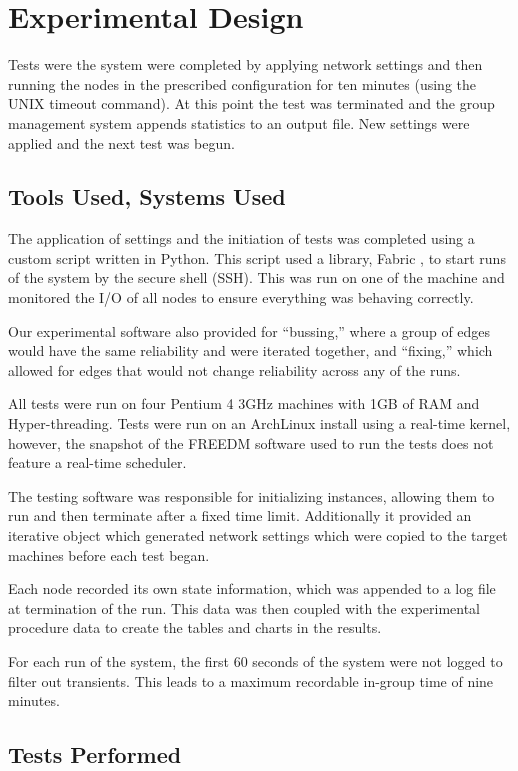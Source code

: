 \section{Experimental Design}

Tests were the system were completed by applying network settings and then running the nodes in the prescribed configuration for ten minutes (using the UNIX timeout command). At this point the test was terminated and the group management system appends statistics to an output file. New settings were applied and the next test was begun.

\subsection{Tools Used, Systems Used}

The application of settings and the initiation of tests was completed using a custom script written in Python. This script used a library, Fabric \cite{FABRIC}, to start runs of the system by the secure shell (SSH). This was run on one of the machine and monitored the I/O of all nodes to ensure everything was behaving correctly.

Our experimental software also provided for ``bussing,'' where a group of edges would
have the same reliability and were iterated together, and ``fixing,'' which allowed for edges that would not change reliability across any of the runs.

All tests were run on four Pentium 4 3GHz machines with 1GB of RAM and Hyper-threading. Tests were run on an ArchLinux install using a real-time kernel, however, the snapshot of the FREEDM software used to run the tests does not feature a real-time scheduler.

The testing software was responsible for initializing instances, allowing them to run and then terminate after a fixed time limit. Additionally it provided an iterative object which generated network settings which were copied to the target machines before each test began.

Each node recorded its own state information, which was appended to a log file at termination of the run. This data was then coupled with the experimental procedure data to create the tables and charts in the results.

For each run of the system, the first 60 seconds of the system were not logged to filter out transients. This leads to a maximum recordable in-group time of nine minutes.
\subsection{Tests Performed}

